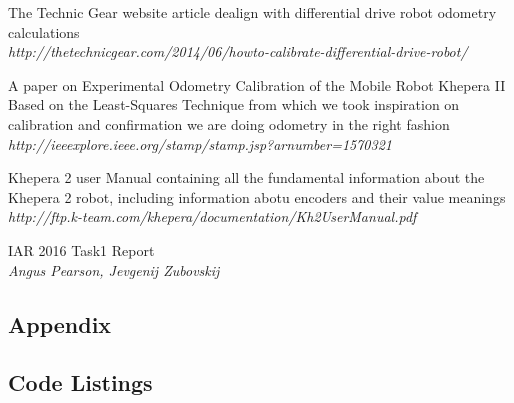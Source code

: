 \documentclass[11pt, a4paper]{article}
\begin{document}
\begin{thebibliography}{9}
\par{The Technic Gear website article dealign with differential drive robot odometry calculations} \\
\textit{http://thetechnicgear.com/2014/06/howto-calibrate-differential-drive-robot/}

\par{A paper on Experimental Odometry Calibration of the Mobile Robot Khepera II Based on the Least-Squares Technique from which we took inspiration on calibration and confirmation we are doing odometry in the right fashion} \\
\textit{http://ieeexplore.ieee.org/stamp/stamp.jsp?arnumber=1570321}

\par{Khepera 2 user Manual containing all the fundamental information about the Khepera 2 robot, including information abotu encoders and their value meanings} \\
\textit{http://ftp.k-team.com/khepera/documentation/Kh2UserManual.pdf}

\par{IAR 2016 Task1 Report} \\
\textit{Angus Pearson, Jevgenij Zubovskij}

\end{thebibliography}


\begin{appendices}
\section*{Appendix}
\subsection{Code Listings}










\end{appendices}
\end{document}
